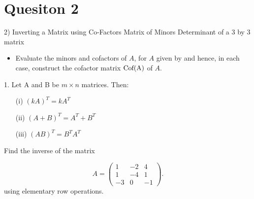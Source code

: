 \documentclass[12pt,a4paper]{article}
\begin{document}
	\section*{Quesiton 2}
	
	2) Inverting a Matrix using Co-Factors
	Matrix of Minors
	Determinant of a 3 by 3 matrix
	
	\begin{itemize}	
		\item Evaluate the  minors and cofactors of $A$, for $A$ given by
		and hence, in each case, construct the cofactor matrix $\textnormal{Cof(A)}$ of $A$.
	\end{itemize}
	
	1. Let A and B be $m \times n$ matrices. Then:
	
	\begin{itemize}
		\item[(i)] $(kA)^T = kA^T$
		\item[(ii)] $(A+B)^T = A^T + B^T$
		\item[(iii)] $(AB)^T = B^TA^T$
	\end{itemize}
	
	
	Find the inverse of the  matrix 
	
	\begin{equation*}
	A=\left( \begin{array}{rrr}
	1 & -2 & 4\\
	1 & -4 & 1\\
	-3 & 0 & -1
	\end{array} \right).
	\end{equation*}
	using elementary row operations.
	
\end{document}
